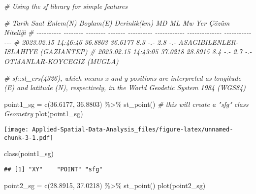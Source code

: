 \documentclass[
]{book}
\newenvironment{Shaded}{\begin{snugshade}}{\end{snugshade}}
\newcommand{\CommentTok}[1]{\textcolor[rgb]{0.56,0.35,0.01}{\textit{#1}}}
\newcommand{\FloatTok}[1]{\textcolor[rgb]{0.00,0.00,0.81}{#1}}
\newcommand{\FunctionTok}[1]{\textcolor[rgb]{0.00,0.00,0.00}{#1}}
\newcommand{\NormalTok}[1]{#1}
\newcommand{\OtherTok}[1]{\textcolor[rgb]{0.56,0.35,0.01}{#1}}
\newcommand{\SpecialCharTok}[1]{\textcolor[rgb]{0.00,0.00,0.00}{#1}}
\begin{document}
\begin{Shaded}
\begin{Highlighting}[]
\CommentTok{\# Using the sf library for simple features}

\CommentTok{\# Tarih      Saat      Enlem(N)  Boylam(E) Derinlik(km)  MD   ML   Mw    Yer                                             Çözüm Niteliği}
\CommentTok{\# {-}{-}{-}{-}{-}{-}{-}{-}{-}{-} {-}{-}{-}{-}{-}{-}{-}{-}  {-}{-}{-}{-}{-}{-}{-}{-}  {-}{-}{-}{-}{-}{-}{-}   {-}{-}{-}{-}{-}{-}{-}{-}{-}{-}    {-}{-}{-}{-}{-}{-}{-}{-}{-}{-}{-}{-}    {-}{-}{-}{-}{-}{-}{-}{-}{-}{-}{-}{-}{-}{-}                                  {-}{-}{-}{-}{-}{-}{-}{-}{-}{-}{-}{-}{-}{-}}
\CommentTok{\# 2023.02.15 14:46:46  36.8803   36.6177        8.3      {-}.{-}  2.8  {-}.{-}   ASAGIBILENLER{-}ISLAHIYE (GAZIANTEP)                }
\CommentTok{\# 2023.02.15 14:43:05  37.0218   28.8915        8.4      {-}.{-}  2.7  {-}.{-}   OTMANLAR{-}KOYCEGIZ (MUGLA)}


\CommentTok{\# sf::st\_crs(4326), which means x and y positions are interpreted as longitude (E) and latitude (N), respectively, in the World Geodetic System 1984 (WGS84)}

\NormalTok{point1\_sg }\OtherTok{=} \FunctionTok{c}\NormalTok{(}\FloatTok{36.6177}\NormalTok{, }\FloatTok{36.8803}\NormalTok{) }\SpecialCharTok{\%\textgreater{}\%} \FunctionTok{st\_point}\NormalTok{() }\CommentTok{\# this will create a "sfg" class Geometry}
\FunctionTok{plot}\NormalTok{(point1\_sg)}
\end{Highlighting}
\end{Shaded}

\texttt{[image: Applied-Spatial-Data-Analysis\_files/figure-latex/unnamed-chunk-3-1.pdf]}

\begin{Shaded}
\begin{Highlighting}[]
\FunctionTok{class}\NormalTok{(point1\_sg)}
\end{Highlighting}
\end{Shaded}

\begin{verbatim}
## [1] "XY"    "POINT" "sfg"
\end{verbatim}

\begin{Shaded}
\begin{Highlighting}[]
\NormalTok{point2\_sg }\OtherTok{=} \FunctionTok{c}\NormalTok{(}\FloatTok{28.8915}\NormalTok{, }\FloatTok{37.0218}\NormalTok{) }\SpecialCharTok{\%\textgreater{}\%} \FunctionTok{st\_point}\NormalTok{()}
\FunctionTok{plot}\NormalTok{(point2\_sg)}
\end{Highlighting}
\end{Shaded}
\end{document}

